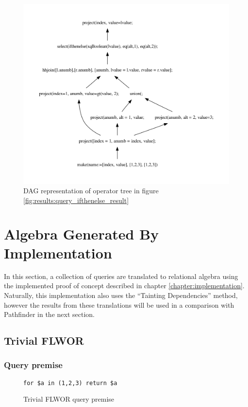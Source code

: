 \begin{figure}[!htp]
\begin{center}
  \includegraphics[width=1.0\textwidth]{img/graphs/ifthenelse_dag}
  \caption{DAG representation of operator tree in figure
  \ref{fig:results:query_ifthenelse_result}}
  \label{fig:results:query_ifthenelse_result_dag}
\end{center}
\end{figure}

\newpage

\section{Algebra Generated By Implementation}
\label{sect:result:implementation_algebra}
In this section, a collection of queries are translated to relational
algebra using the implemented proof of concept described in chapter
\ref{chapter:implementation}. Naturally, this implementation also uses the
``Tainting Dependencies'' method, however the results from these translations
will be used in a comparison with Pathfinder in the next section.

\subsection{Trivial FLWOR}
\label{sect:results:algebra:generated:trivial_flwor}
\subsubsection{Query premise}
\begin{figure}[!htp]
\begin{center}
\begin{Verbatim}
for $a in (1,2,3) return $a
\end{Verbatim}
  \caption{Trivial FLWOR query premise}
  \label{fig:results:query_trivial_flwor}
\end{center}
\end{figure}


